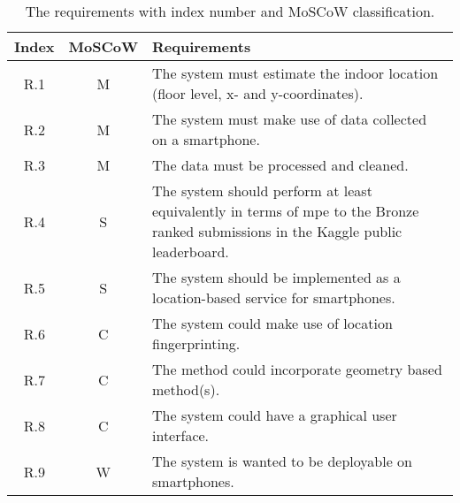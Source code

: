 \begin{table}[H]
\caption{The requirements with index number and MoSCoW classification.}
\begin{tabularx}{\textwidth}{| c | c | X |}
\hline
\textbf{Index} & \textbf{MoSCoW} & \textbf{Requirements}\\\hline
R.1 & M & The system must estimate the indoor location (floor level, x- and y-coordinates). \\\hline
R.2 & M & The system must make use of data collected on a smartphone.\\\hline
R.3 & M & The data must be processed and cleaned.\\\hline
R.4 & S & The system should perform at least equivalently in terms of \gls{mpe} to the Bronze ranked submissions in the Kaggle public leaderboard.\\\hline
R.5 & S & The system should be implemented as a location-based service for smartphones.\\\hline
R.6 & C & The system could make use of location fingerprinting.\\\hline
R.7 & C & The method could incorporate geometry based method(s).\\\hline
R.8 & C & The system could have a graphical user interface.\\\hline
R.9 & W & The system is wanted to be deployable on smartphones.\\\hline
\end{tabularx}
\label{table:requirements}
\end{table}
